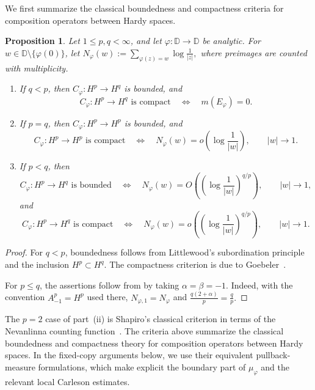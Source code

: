 \documentclass[11pt, reqno]{amsart}
\newtheorem{proposition}[theorem]{Proposition}
\theoremstyle{definition}
\theoremstyle{remark}
\newcommand{\D}{\mathbb{D}}
\begin{document}
We first summarize the classical boundedness and compactness criteria
for composition operators between Hardy spaces.

\begin{proposition}
\label{prop:classical}
Let \(1\le p,q<\infty\), and let \(\varphi:\D\to\D\) be analytic.
For \(w\in\D\setminus\{\varphi(0)\}\), let
\(
        N_\varphi(w)
        :=
        \sum\limits_{\varphi(z)=w}
        \log\frac{1}{|z|},
\)
where preimages are counted with multiplicity.

\begin{enumerate}[label=\textup{(\roman*)}]
\item If \(q<p\), then \(C_\varphi:H^p\to H^q\) is bounded, and
\[
        C_\varphi:H^p\to H^q\text{ is compact}
        \quad\Longleftrightarrow\quad
        m(E_\varphi)=0.
\]

\item If \(p=q\), then \(C_\varphi:H^p\to H^p\) is bounded, and
\[
        C_\varphi:H^p\to H^p\text{ is compact}
        \quad\Longleftrightarrow\quad
        N_\varphi(w)
        =
        o\!\left(\log\frac{1}{|w|}\right),
        \qquad |w|\to1.
\]

\item If \(p<q\), then
\[
        C_\varphi:H^p\to H^q\text{ is bounded}
        \quad\Longleftrightarrow\quad
        N_\varphi(w)
        =
        O\!\left(
        \left(\log\frac{1}{|w|}\right)^{q/p}
        \right),
        \qquad |w|\to1,
\]
and
\[
        C_\varphi:H^p\to H^q\text{ is compact}
        \quad\Longleftrightarrow\quad
        N_\varphi(w)
        =
        o\!\left(
        \left(\log\frac{1}{|w|}\right)^{q/p}
        \right),
        \qquad |w|\to1.
\]
\end{enumerate}
\end{proposition}

\begin{proof}
For \(q<p\), boundedness follows from Littlewood's subordination
principle and the inclusion \(H^p\subset H^q\). The compactness
criterion is due to Goebeler~\cite[Corollary~5, p.~390]{Goebeler2001}.

For \(p\le q\), the assertions follow from
\cite[Theorem~A, p.~311]{PerezGonzalezRattyaVukotic2007} by taking
\(\alpha=\beta=-1\). Indeed, with the convention \(A_{-1}^p=H^p\) used there,
\(N_{\varphi,1}=N_\varphi\) and
\(
\frac{q(2+\alpha)}{p}
=\frac{q}{p}.
\)
\end{proof}
The \(p=2\) case of part~\textup{(ii)} is Shapiro's classical criterion in terms of the Nevanlinna counting
function~\cite{Shapiro1987}.
The criteria above summarize the classical boundedness and compactness
theory for composition operators between Hardy spaces. In the
fixed-copy arguments below, we use their equivalent pullback-measure
formulations, which make explicit the boundary part of
\(\mu_\varphi\) and the relevant local Carleson estimates.
\end{document}
